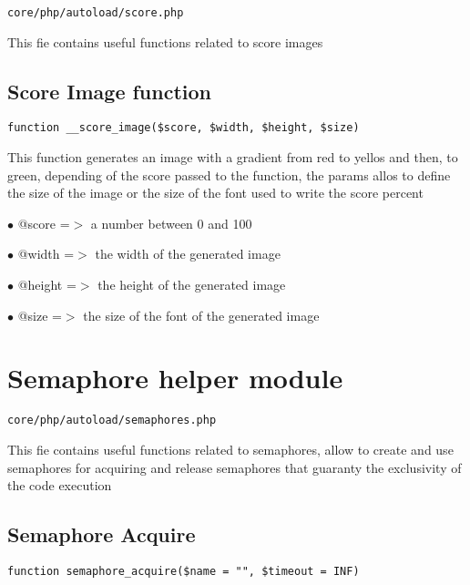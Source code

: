 \documentclass[a4paper]{book}
\begin{document}
\begin{lstlisting}
core/php/autoload/score.php
\end{lstlisting}

This fie contains useful functions related to score images

\hypertarget{toc215}{}
\subsection{Score Image function}

\begin{lstlisting}
function __score_image($score, $width, $height, $size)
\end{lstlisting}

This function generates an image with a gradient from red to yellos and
then, to green, depending of the score passed to the function, the params
allos to define the size of the image or the size of the font used to
write the score percent

\begin{compactitem}
\item[\color{myblue}$\bullet$] @score  =$>$ a number between 0 and 100
\item[\color{myblue}$\bullet$] @width  =$>$ the width of the generated image
\item[\color{myblue}$\bullet$] @height =$>$ the height of the generated image
\item[\color{myblue}$\bullet$] @size   =$>$ the size of the font of the generated image
\end{compactitem}

\hypertarget{toc216}{}
\section{Semaphore helper module}

\begin{lstlisting}
core/php/autoload/semaphores.php
\end{lstlisting}

This fie contains useful functions related to semaphores, allow to create and use semaphores
for acquiring and release semaphores that guaranty the exclusivity of the code execution

\hypertarget{toc217}{}
\subsection{Semaphore Acquire}

\begin{lstlisting}
function semaphore_acquire($name = "", $timeout = INF)
\end{lstlisting}
\end{document}
